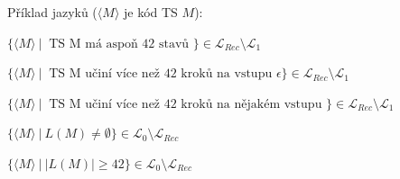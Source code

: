 \begin{compactitem}
    \item Příklad jazyků ($ \langle M \rangle $ je kód TS $M$): \begin{compactitem}
        \item $\{ \langle M \rangle ~|~ \text{ TS M má aspoň 42 stavů } \} \in \mathcal{L}_{Rec} \setminus \mathcal{L}_1$
        \item $\{ \langle M \rangle ~|~ \text{ TS M učiní více než 42 kroků na vstupu } \epsilon \} \in \mathcal{L}_{Rec} \setminus \mathcal{L}_1$
        \item $\{ \langle M \rangle ~|~ \text{ TS M učiní více než 42 kroků na nějakém vstupu } \} \in \mathcal{L}_{Rec} \setminus \mathcal{L}_1$

        \item $\{ \langle M \rangle ~|~ L(M) \not= \emptyset \} \in \mathcal{L}_{0} \setminus \mathcal{L}_{Rec}$
        \item $\{ \langle M \rangle ~|~ |L(M)| \geq 42 \} \in \mathcal{L}_{0} \setminus \mathcal{L}_{Rec}$
    \end{compactitem}
\end{compactitem}


